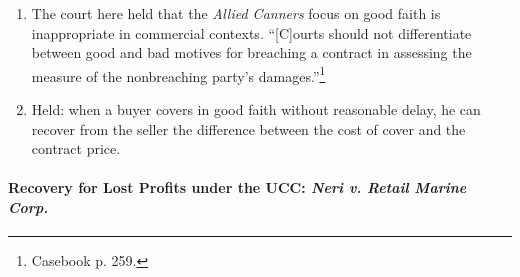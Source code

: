 \begin{enumerate}
\begin{enumerate}
    \end{enumerate}
    \item The court here held that the \emph{Allied Canners} focus on good 
    faith is inappropriate in commercial contexts. ``[C]ourts should not 
    differentiate between good and bad motives for breaching a contract in 
    assessing the measure of the nonbreaching party's 
    damages.''\footnote{Casebook p. 259.}
    \item Held: when a buyer covers in good faith without reasonable delay, 
    he can recover from the seller the difference between the cost of cover 
    and the contract price.
\end{enumerate}

\paragraph{Recovery for Lost Profits under the UCC: \emph{Neri v. Retail 
Marine Corp.}}

